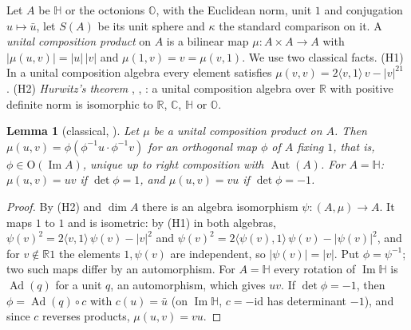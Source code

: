 \documentclass[11pt,reqno]{amsart}
\newtheorem{lemma}[theorem]{Lemma}
\theoremstyle{definition}
\theoremstyle{remark}
\numberwithin{equation}{section}
\newcommand{\R}{\mathbb{R}}
\newcommand{\C}{\mathbb{C}}
\newcommand{\HH}{\mathbb{H}}
\newcommand{\Aut}{\operatorname{Aut}}
\newcommand{\Ad}{\operatorname{Ad}}
\newcommand{\im}{\operatorname{Im}}
\newcommand{\ip}[2]{\langle #1,#2\rangle}
\newcommand{\OO}{\mathrm{O}}
\begin{document}
Let $A$ be $\HH$ or the octonions $\mathbb O$, with the Euclidean norm, unit $1$ and conjugation $u\mapsto\bar u$, let $S(A)$ be its
unit sphere and $\kappa$ the standard comparison on it.  A \emph{unital composition product} on $A$ is a bilinear map
$\mu\colon A\times A\to A$ with $\lvert\mu(u,v)\rvert=\lvert u\rvert\,\lvert v\rvert$ and $\mu(1,v)=v=\mu(v,1)$.  We use two classical facts.
(H1) In a unital composition algebra every element satisfies $\mu(v,v)=2\ip v1\,v-\lvert v\rvert^21$ \cite[Ch.~1]{SV00}.
(H2) \emph{Hurwitz's theorem} \cite{Hurwitz1898}, \cite[Ch.~1]{SV00}, \cite{CS03}: a unital composition algebra over $\R$ with positive
definite norm is isomorphic to $\R$, $\C$, $\HH$ or $\mathbb O$.

\begin{lemma}[classical, {\cite[Ch.~1]{SV00}}]\label{lem:hurwitz}
Let $\mu$ be a unital composition product on $A$.  Then $\mu(u,v)=\phi(\phi^{-1}u\cdot\phi^{-1}v)$ for an orthogonal map $\phi$ of $A$
fixing $1$, that is, $\phi\in\OO(\im A)$, unique up to right composition with $\Aut(A)$.  For $A=\HH$: $\mu(u,v)=uv$ if
$\det\phi=1$, and $\mu(u,v)=vu$ if $\det\phi=-1$.
\end{lemma}
\begin{proof}
By (H2) and $\dim A$ there is an algebra isomorphism $\psi\colon(A,\mu)\to A$.  It maps $1$ to $1$ and is isometric: by (H1) in both
algebras, $\psi(v)^2=2\ip v1\,\psi(v)-\lvert v\rvert^2$ and $\psi(v)^2=2\ip{\psi(v)}1\,\psi(v)-\lvert\psi(v)\rvert^2$, and for $v\notin\R1$ the
elements $1,\psi(v)$ are independent, so $\lvert\psi(v)\rvert=\lvert v\rvert$.  Put $\phi=\psi^{-1}$; two such maps differ by an
automorphism.  For $A=\HH$ every rotation of $\im\HH$ is $\Ad(q)$ for a unit $q$, an automorphism, which gives $uv$.  If
$\det\phi=-1$, then $\phi=\Ad(q)\circ c$ with $c(u)=\bar u$ (on $\im\HH$, $c=-\mathrm{id}$ has determinant $-1$), and since $c$ reverses
products, $\mu(u,v)=vu$.
\end{proof}
\end{document}
